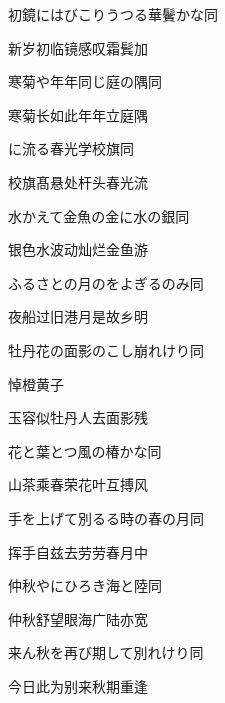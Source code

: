 \begin{haiku}
    {\FH 初鏡にはびこりうつる華鬢かな}\hfill{\FH 同}

    {\FK 新岁初临镜感叹霜鬂加}
\end{haiku}

\begin{haiku}
    {\FH 寒菊や年年同じ庭の隅}\hfill{\FH 同}

    {\FK 寒菊长如此年年立庭隅}
\end{haiku}

\begin{haiku}
    {\FH {}に流る春光学校旗}\hfill{\FH 同}

    {\FK 校旗髙悬处杆头春光流}
\end{haiku}

\begin{haiku}
    {\FH 水かえて金魚の金に水の銀}\hfill{\FH 同}

    {\FK 银色水波动灿烂金鱼游}
\end{haiku}

\begin{haiku}
    {\FH ふるさとの月のをよぎるのみ}\hfill{\FH 同}

    {\FK 夜船过旧港月是故乡明}
\end{haiku}

\begin{haiku}
    {\FH 牡丹花の面影のこし崩れけり}\hfill{\FH 同}

    {\FK 悼橙黄子}

    {\FK 玉容似牡丹人去面影残}
\end{haiku}

\begin{haiku}
    {\FH 花と葉とつ風の椿かな}\hfill{\FH 同}

    {\FK 山茶乘春荣花叶互搏风}
\end{haiku}

\begin{haiku}
    {\FH 手を上げて別るる時の春の月}\hfill{\FH 同}

    {\FK 挥手自兹去劳劳春月中}
\end{haiku}

\begin{haiku}
    {\FH 仲秋やにひろき海と陸}\hfill{\FH 同}

    {\FK 仲秋舒望眼海广陆亦宽}
\end{haiku}

\begin{haiku}
    {\FH 来ん秋を再び期して別れけり}\hfill{\FH 同}

    {\FK 今日此为别来秋期重逢}
\end{haiku}


